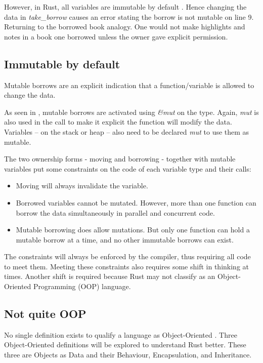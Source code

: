 However, in Rust, all variables are immutable by default \cite{klabnik_2019_01}.
Hence changing the data in \textit{take\_borrow} causes an error stating the borrow is not mutable on line 9.
Returning to the borrowed book analogy.
One would not make highlights and notes in a book one borrowed unless the owner gave explicit permission.

\subsection{Immutable by default}
Mutable borrows are an explicit indication that a function/variable is allowed to change the data.


As seen in , mutable borrows are activated using \textit{\&mut } on the type.
Again, \textit{mut} is also used in the call to make it explicit the function will modify the data.
Variables -- on the stack or heap -- also need to be declared \textit{mut} to use them as mutable.
\cite{klabnik_2019_01}

The two ownership forms - moving and borrowing - together with mutable variables put some constraints on the code of each variable type and their calls: \cite{klabnik_2019_01}
\begin{itemize}
	\item Moving will always invalidate the variable.
	\item Borrowed variables cannot be mutated.
	      However, more than one function can borrow the data simultaneously in parallel and concurrent code.
	\item Mutable borrowing does allow mutations.
	      But only one function can hold a mutable borrow at a time, and no other immutable borrows can exist.
\end{itemize}

The constraints will always be enforced by the compiler, thus requiring all code to meet them.
Meeting these constraints also requires some shift in thinking at times.
Another shift is required because Rust may not classify as an Object-Oriented Programming (OOP) language.

\subsection{Not quite OOP}
No single definition exists to qualify a language as Object-Oriented \cite{meyer_97_01,stefik_85_01,gamma_94_01,klabnik_2019_01}.
Three Object-Oriented definitions will be explored to understand Rust better.
These three are Objects as Data and their Behaviour, Encapsulation, and Inheritance.

